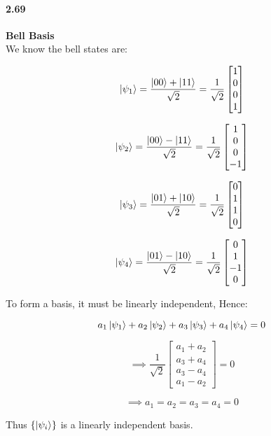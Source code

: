 \paragraph{2.69} \textbf{Bell Basis}%
\\

We know the bell states are:

$$|\psi_1\rangle = \frac{\ket{00}+\ket{11}}{\sqrt{2}} = \frac{1}{\sqrt{2}}\begin{bmatrix}
    1 \\ 0 \\ 0 \\ 1
\end{bmatrix}$$

$$|\psi_2\rangle = \frac{\ket{00}-\ket{11}}{\sqrt{2}} = \frac{1}{\sqrt{2}}\begin{bmatrix}
    1 \\ 0 \\ 0 \\ -1
\end{bmatrix}$$

$$|\psi_3\rangle = \frac{\ket{01}+\ket{10}}{\sqrt{2}} = \frac{1}{\sqrt{2}}\begin{bmatrix}
    0 \\ 1 \\ 1 \\ 0
\end{bmatrix}$$

$$|\psi_4\rangle = \frac{\ket{01}-\ket{10}}{\sqrt{2}} = \frac{1}{\sqrt{2}}\begin{bmatrix}
    0 \\ 1 \\ -1 \\ 0
\end{bmatrix}$$

To form a basis, it must be linearly independent, Hence:

$$ a_1 \ket{\psi_1} + a_2 \ket{\psi_2} + a_3 \ket{\psi_3} + a_4 \ket{\psi_4} = 0$$

$$ \implies \frac{1}{\sqrt{2}} \begin{bmatrix}
    a_1 + a_2 \\ a_3 + a_4 \\ a_3 - a_4 \\ a_1 - a_2
\end{bmatrix} = 0$$

$$ \implies a_1 = a_2 = a_3 = a_4 = 0$$

Thus $\{\ket{\psi_i}\}$ is a linearly independent basis.

